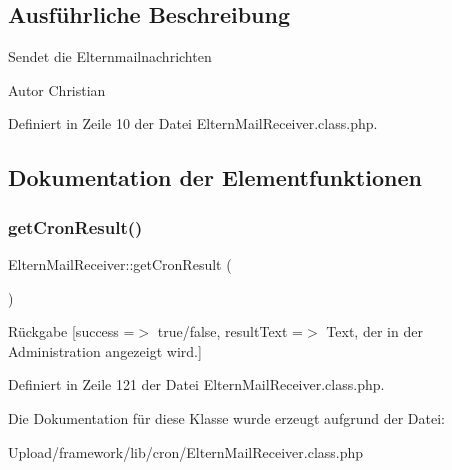 \subsection{Ausführliche Beschreibung}
Sendet die Elternmailnachrichten \begin{DoxyAuthor}{Autor}
Christian 
\end{DoxyAuthor}


Definiert in Zeile 10 der Datei Eltern\+Mail\+Receiver.\+class.\+php.



\subsection{Dokumentation der Elementfunktionen}
\mbox{\label{class_eltern_mail_receiver_a562fa2d7b3adb3908c494e817f972a79}} 
\subsubsection{\texorpdfstring{get\+Cron\+Result()}{getCronResult()}}
{\footnotesize\ttfamily Eltern\+Mail\+Receiver\+::get\+Cron\+Result (\begin{DoxyParamCaption}{ }\end{DoxyParamCaption})}

\begin{DoxyReturn}{Rückgabe}
\mbox{[}\textquotesingle{}success\textquotesingle{} =$>$ \textquotesingle{}true/false\textquotesingle{}, \textquotesingle{}result\+Text\textquotesingle{} =$>$ \textquotesingle{}Text, der in der Administration angezeigt wird.\textquotesingle{}\mbox{]} 
\end{DoxyReturn}


Definiert in Zeile 121 der Datei Eltern\+Mail\+Receiver.\+class.\+php.



Die Dokumentation für diese Klasse wurde erzeugt aufgrund der Datei\+:\begin{DoxyCompactItemize}
\item 
Upload/framework/lib/cron/Eltern\+Mail\+Receiver.\+class.\+php\end{DoxyCompactItemize}
